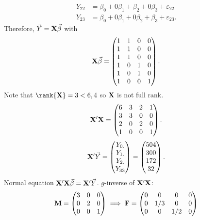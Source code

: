\begin{Example}{}{}
\begin{align*}
        Y_{22} & =\beta_0+0\beta_1+\beta_2+0\beta_3+\varepsilon_{22}  \\
        Y_{23} & =\beta_0+0\beta_1+0\beta_2+\beta_3+\varepsilon_{23}.
    \end{align*}
    Therefore, $ \vec{Y}=\mathbf{X}\vec{\beta} $ with
    \[ \mathbf{X}\vec{\beta}=\begin{pmatrix}
            1 & 1 & 0 & 0 \\
            1 & 1 & 0 & 0 \\
            1 & 1 & 0 & 0 \\
            1 & 0 & 1 & 0 \\
            1 & 0 & 1 & 0 \\
            1 & 0 & 0 & 1
        \end{pmatrix}. \]
    Note that $ \rank{\Matrix{X}}=3<\min{6,4} $ so $ \mathbf{X} $ is not full rank.
    \[ \mathbf{X}'\mathbf{X}=\begin{pmatrix}
            6 & 3 & 2 & 1 \\
            3 & 3 & 0 & 0 \\
            2 & 0 & 2 & 0 \\
            1 & 0 & 0 & 1
        \end{pmatrix}. \]
    \[ \mathbf{X}'\vec{Y}=\begin{pmatrix}
            Y_{0.} \\
            Y_{1.} \\
            Y_{2.} \\
            Y_{33}
        \end{pmatrix}=\begin{pmatrix}
            504 \\ 300 \\ 172 \\32
        \end{pmatrix}. \]
    Normal equation $ \mathbf{X}'\mathbf{X}\vec{\beta}=\mathbf{X}'\vec{Y} $.
    $ g $-inverse of $ \mathbf{X}'\mathbf{X} $:
    \[ \mathbf{M}=\begin{pmatrix}
            3 & 0 & 0 \\
            0 & 2 & 0 \\
            0 & 0 & 1
        \end{pmatrix}\implies
        \mathbf{F}=\begin{pmatrix}
            0 & 0   & 0   & 0 \\
            0 & 1/3 & 0   & 0 \\
            0 & 0   & 1/2 & 0 \\

\end{pmatrix}\]
\end{Example}

